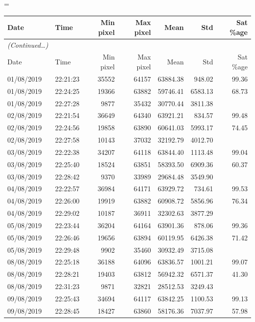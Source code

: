 \LTcapwidth=\linewidth
\begin{longtable}{llrrrrr} 
\hline
Date & Time & Min pixel & Max pixel & Mean & Std & Sat \%age \\ \hline
\endfirsthead
\hline
\textit{(Continued\ldots)}\\
Date & Time & Min pixel & Max pixel & Mean & Std & Sat \%age \\ \hline
\endhead
01/08/2019 & 22:21:23 & 35552 & 64157 & 63884.38 & 948.02 & 99.36 \\
01/08/2019 & 22:24:25 & 19366 & 63882 & 59746.41 & 6583.13 & 68.73 \\
01/08/2019 & 22:27:28 & 9877 & 35432 & 30770.44 & 3811.38 &  \\
02/08/2019 & 22:21:54 & 36649 & 64340 & 63921.21 & 834.57 & 99.48 \\
02/08/2019 & 22:24:56 & 19858 & 63890 & 60641.03 & 5993.17 & 74.45 \\
02/08/2019 & 22:27:58 & 10143 & 37032 & 32192.79 & 4012.70 &  \\
03/08/2019 & 22:22:38 & 34207 & 64118 & 63844.40 & 1113.48 & 99.04 \\
03/08/2019 & 22:25:40 & 18524 & 63851 & 58393.50 & 6909.36 & 60.37 \\
03/08/2019 & 22:28:42 & 9370 & 33989 & 29684.48 & 3549.90 &  \\
04/08/2019 & 22:22:57 & 36984 & 64171 & 63929.72 & 734.61 & 99.53 \\
04/08/2019 & 22:26:00 & 19919 & 63882 & 60908.72 & 5856.96 & 76.34 \\
04/08/2019 & 22:29:02 & 10187 & 36911 & 32302.63 & 3877.29 &  \\
05/08/2019 & 22:23:44 & 36204 & 64164 & 63901.36 & 878.06 & 99.36 \\
05/08/2019 & 22:26:46 & 19656 & 63894 & 60119.95 & 6426.38 & 71.42 \\
05/08/2019 & 22:29:48 & 9902 & 35460 & 30932.49 & 3715.08 &  \\
08/08/2019 & 22:25:18 & 36188 & 64096 & 63836.57 & 1001.21 & 99.07 \\
08/08/2019 & 22:28:21 & 19403 & 63812 & 56942.32 & 6571.37 & 41.30 \\
08/08/2019 & 22:31:23 & 9871 & 32821 & 28512.53 & 3249.43 &  \\
09/08/2019 & 22:25:43 & 34694 & 64117 & 63842.25 & 1100.53 & 99.13 \\
09/08/2019 & 22:28:45 & 18427 & 63860 & 58176.36 & 7037.97 & 57.98 \\

\end{longtable}
